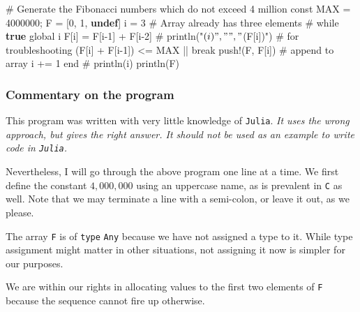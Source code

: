 \documentclass[
  a4paper,
]{article}
\newenvironment{Shaded}{\begin{snugshade}}{\end{snugshade}}
\newcommand{\CommentTok}[1]{\textcolor[rgb]{0.50,0.62,0.50}{#1}}
\newcommand{\ConstantTok}[1]{\textcolor[rgb]{0.86,0.64,0.64}{\textbf{#1}}}
\newcommand{\ControlFlowTok}[1]{\textcolor[rgb]{0.94,0.87,0.69}{#1}}
\newcommand{\FloatTok}[1]{\textcolor[rgb]{0.75,0.75,0.82}{#1}}
\newcommand{\FunctionTok}[1]{\textcolor[rgb]{0.94,0.94,0.56}{#1}}
\newcommand{\KeywordTok}[1]{\textcolor[rgb]{0.94,0.87,0.69}{#1}}
\newcommand{\NormalTok}[1]{\textcolor[rgb]{0.80,0.80,0.80}{#1}}
\newcommand{\OperatorTok}[1]{\textcolor[rgb]{0.94,0.94,0.82}{#1}}
\begin{document}
\begin{Shaded}
\begin{Highlighting}[]
\CommentTok{\# Generate the Fibonacci numbers which do not exceed 4 million}
\KeywordTok{const}\NormalTok{ MAX }\OperatorTok{=} \FloatTok{4000000}\NormalTok{;}
\NormalTok{F }\OperatorTok{=}\NormalTok{ [}\FloatTok{0}\NormalTok{, }\FloatTok{1}\NormalTok{, }\ConstantTok{undef}\NormalTok{]}
\NormalTok{i }\OperatorTok{=} \FloatTok{3} \CommentTok{\# Array already has three elements}
\CommentTok{\#}
\ControlFlowTok{while} \ConstantTok{true}
  \KeywordTok{global}\NormalTok{ i}
\NormalTok{  F[i] }\OperatorTok{=}\NormalTok{ F[i}\OperatorTok{{-}}\FloatTok{1}\NormalTok{] }\OperatorTok{+}\NormalTok{ F[i}\OperatorTok{{-}}\FloatTok{2}\NormalTok{]}
  \CommentTok{\# println("$(i)" , " ", "$(F[i])") \# for troubleshooting}
\NormalTok{  (F[i] }\OperatorTok{+}\NormalTok{ F[i}\OperatorTok{{-}}\FloatTok{1}\NormalTok{]) }\OperatorTok{\textless{}=}\NormalTok{ MAX }\OperatorTok{||} \ControlFlowTok{break}
  \FunctionTok{push!}\NormalTok{(F, F[i]) }\CommentTok{\# append to array}
\NormalTok{  i }\OperatorTok{+=} \FloatTok{1}
\ControlFlowTok{end}
\CommentTok{\#}
\FunctionTok{println}\NormalTok{(i)}
\FunctionTok{println}\NormalTok{(F)}
\end{Highlighting}
\end{Shaded}

\hypertarget{commentary-on-the-program}{%
\subsubsection{Commentary on the
program}\label{commentary-on-the-program}}

This program was written with very little knowledge of \texttt{Julia}.
\emph{It uses the wrong approach, but gives the right answer. It should
not be used as an example to write code in \texttt{Julia}.}

Nevertheless, I will go through the above program one line at a time. We
first define the constant \(4,000,000\) using an uppercase name, as is
prevalent in \texttt{C} as well. Note that we may terminate a line with
a semi-colon, or leave it out, as we please.

The array \texttt{F} is of \texttt{type} \texttt{Any} because we have
not assigned a type to it. While type assignment might matter in other
situations, not assigning it now is simpler for our purposes.

We are within our rights in allocating values to the first two elements
of \texttt{F} because the sequence cannot fire up otherwise.
\end{document}
